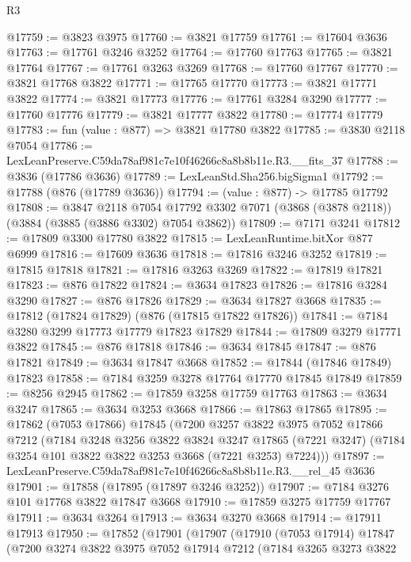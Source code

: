 \begin{lexlean}{R3}
\begin{coremodule}
@17759 := @3823 @3975
@17760 := @3821 @17759
@17761 := @17604 @3636
@17763 := @17761 @3246 @3252
@17764 := @17760 @17763
@17765 := @3821 @17764
@17767 := @17761 @3263 @3269
@17768 := @17760 @17767
@17770 := @3821 @17768 @3822
@17771 := @17765 @17770
@17773 := @3821 @17771 @3822
@17774 := @3821 @17773
@17776 := @17761 @3284 @3290
@17777 := @17760 @17776
@17779 := @3821 @17777 @3822
@17780 := @17774 @17779
@17783 := fun (value : @877) => @3821 @17780 @3822
@17785 := @3830 @2118 @7054
@17786 := LexLeanPreserve.C59da78af981c7e10f46266c8a8b8b11e.R3.__fits_37
@17788 := @3836 (@17786 @3636)
@17789 := LexLeanStd.Sha256.bigSigma1
@17792 := @17788 (@876 (@17789 @3636))
@17794 := (value : @877) -> @17785 @17792
@17808 := @3847
    @2118
    @7054
    @17792
    @3302
    @7071
    (@3868 (@3878 @2118))
    (@3884 (@3885 (@3886 @3302) @7054 @3862))
@17809 := @7171 @3241
@17812 := @17809 @3300 @17780 @3822
@17815 := LexLeanRuntime.bitXor @877 @6999
@17816 := @17609 @3636
@17818 := @17816 @3246 @3252
@17819 := @17815 @17818
@17821 := @17816 @3263 @3269
@17822 := @17819 @17821
@17823 := @876 @17822
@17824 := @3634 @17823
@17826 := @17816 @3284 @3290
@17827 := @876 @17826
@17829 := @3634 @17827 @3668
@17835 := @17812 (@17824 @17829) (@876 (@17815 @17822 @17826))
@17841 := @7184 @3280 @3299 @17773 @17779 @17823 @17829
@17844 := @17809 @3279 @17771 @3822
@17845 := @876 @17818
@17846 := @3634 @17845
@17847 := @876 @17821
@17849 := @3634 @17847 @3668
@17852 := @17844 (@17846 @17849) @17823
@17858 := @7184 @3259 @3278 @17764 @17770 @17845 @17849
@17859 := @8256 @2945
@17862 := @17859 @3258 @17759 @17763
@17863 := @3634 @3247
@17865 := @3634 @3253 @3668
@17866 := @17863 @17865
@17895 := @17862
    (@7053 @17866)
    @17845
    (@7200
      @3257
      @3822
      @3975
      @7052
      @17866
      @7212
      (@7184
        @3248
        @3256
        @3822
        @3824
        @3247
        @17865
        (@7221 @3247)
        (@7184 @3254 @101 @3822 @3822 @3253 @3668 (@7221 @3253) @7224)))
@17897 := LexLeanPreserve.C59da78af981c7e10f46266c8a8b8b11e.R3.__rel_45 @3636
@17901 := @17858 (@17895 (@17897 @3246 @3252))
@17907 := @7184 @3276 @101 @17768 @3822 @17847 @3668
@17910 := @17859 @3275 @17759 @17767
@17911 := @3634 @3264
@17913 := @3634 @3270 @3668
@17914 := @17911 @17913
@17950 := @17852
    (@17901
      (@17907
        (@17910
          (@7053 @17914)
          @17847
          (@7200
            @3274
            @3822
            @3975
            @7052
            @17914
            @7212
            (@7184
              @3265
              @3273
              @3822

\end{coremodule}
\end{lexlean}
